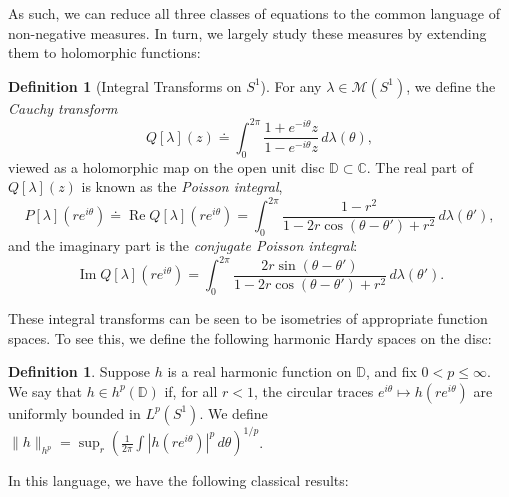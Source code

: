 \documentclass{cams-l} %
\newcommand{\CC}{\mathbb C}
\newcommand{\DD}{\mathbb D}
\newcommand{\cM}{\mathcal M}
\newcommand{\op}{\operatorname}
\renewcommand{\Re}{\op{Re}}
\renewcommand{\Im}{\op{Im}}
\theoremstyle{definition}
\newtheorem{definition}[theorem]{Definition}
\theoremstyle{remark}
\numberwithin{equation}{section}
\begin{document}
As such, we can reduce all three classes of equations to the common language of non-negative measures. In turn, we largely study these measures by extending them to holomorphic functions:
\begin{definition}[Integral Transforms on $S^1$]
    For any $\lambda\in\cM(S^1)$, we define the \emph{Cauchy transform}
\begin{equation}\label{eq:cauchycirc}
    Q[\lambda](z)\doteq \int_{0}^{2\pi}\frac{1+e^{-i\theta}z}{1-e^{-i\theta}z}\,d\lambda(\theta),
\end{equation}
viewed as a holomorphic map on the open unit disc $\DD\subset\CC$. The real part of $Q[\lambda](z)$ is known as the \emph{Poisson integral},
\begin{equation}\label{eq:poissoncirc}
    P[\lambda](re^{i\theta}) \doteq \Re Q[\lambda](re^{i\theta}) = \int_0^{2\pi} \frac{1-r^2}{1-2r\cos(\theta-\theta')+r^2}\,d\lambda(\theta'),
\end{equation}
and the imaginary part is the \emph{conjugate Poisson integral}:
\begin{equation}\label{eq:poissoncirc_conj}
    \Im Q[\lambda](re^{i\theta}) = \int_0^{2\pi} \frac{2r\sin(\theta-\theta')}{1-2r\cos(\theta-\theta')+r^2}\,d\lambda(\theta').
\end{equation}
\end{definition}
These integral transforms can be seen to be isometries of appropriate function spaces. To see this, we define the following harmonic Hardy spaces on the disc:
\begin{definition}
    Suppose $h$ is a real harmonic function on $\DD$, and fix $0<p\leq\infty$. We say that $h\in h^p(\DD)$ if, for all $r<1$, the circular traces $e^{i\theta}\mapsto h(re^{i\theta})$ are uniformly bounded in $L^p(S^1)$. We define $\|h\|_{h^p}=\sup_r \left(\frac{1}{2\pi}\int |h(re^{i\theta})|^p\,d\theta\right)^{1/p}$.
\end{definition}
In this language, we have the following classical results:
\end{document}

